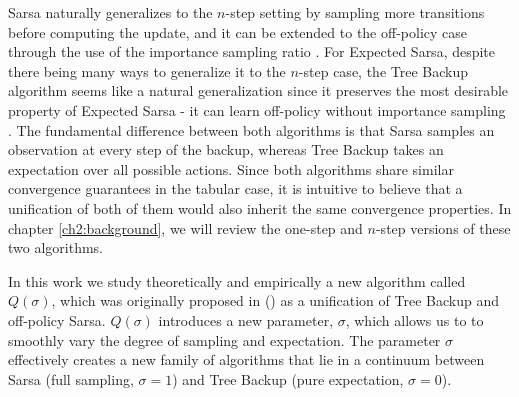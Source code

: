 
Sarsa naturally generalizes to the $n$-step setting by sampling more transitions before computing the update, and it can be extended to the off-policy case through the use of the importance sampling ratio \parencite{sutton2018}.
For Expected Sarsa, despite there being many ways to generalize it to the $n$-step case, the Tree Backup algorithm seems like a natural generalization since it preserves the most desirable property of Expected Sarsa - it can learn off-policy without importance sampling \parencite{precup2000}.
The fundamental difference between both algorithms is that Sarsa samples an observation at every step of the backup, whereas Tree Backup takes an expectation over all possible actions.
Since both algorithms share similar convergence guarantees in the tabular case, it is intuitive to believe that a unification of both of them would also inherit the same convergence properties.
In chapter \ref{ch2:background}, we will review the one-step and $n$-step versions of these two algorithms.

In this work we study theoretically and empirically a new algorithm called $Q(\sigma)$, which was originally proposed in \citeauthor{precup2000} (\citeyear{precup2000}) as a unification of Tree Backup and off-policy Sarsa.
$Q(\sigma)$ introduces a new parameter, $\sigma$, which allows us to to smoothly vary the degree of sampling and expectation.
The parameter $\sigma$ effectively creates a new family of algorithms that lie in a continuum between Sarsa (full sampling, $\sigma = 1$) and Tree Backup (pure expectation, $\sigma = 0$).

